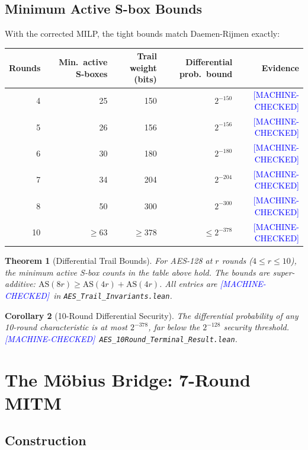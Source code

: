 \documentclass[11pt,letterpaper]{article}
\newtheorem{theorem}{Theorem}[section]
\newtheorem{corollary}[theorem]{Corollary}
\newcommand{\MC}{\textcolor{blue}{[MACHINE-CHECKED]}}
\begin{document}
\subsection{Minimum Active S-box Bounds}

With the corrected MILP, the tight bounds match Daemen-Rijmen exactly:

\begin{center}
\begin{tabular}{rrrrr}
\toprule
Rounds & Min.\ active S-boxes & Trail weight (bits) & Differential prob.\ bound & Evidence \\
\midrule
4 & 25 & 150 & $2^{-150}$ & \MC \\
5 & 26 & 156 & $2^{-156}$ & \MC \\
6 & 30 & 180 & $2^{-180}$ & \MC \\
7 & 34 & 204 & $2^{-204}$ & \MC \\
8 & 50 & 300 & $2^{-300}$ & \MC \\
10 & $\geq 63$ & $\geq 378$ & $\leq 2^{-378}$ & \MC \\
\bottomrule
\end{tabular}
\end{center}

\begin{theorem}[Differential Trail Bounds]
\label{thm:trails}
For AES-128 at $r$ rounds ($4 \leq r \leq 10$), the minimum active S-box
counts in the table above hold.  The bounds are super-additive:
$\mathrm{AS}(8r) \geq \mathrm{AS}(4r) + \mathrm{AS}(4r)$.
All entries are \MC\ in \texttt{AES\_Trail\_Invariants.lean}.
\end{theorem}

\begin{corollary}[10-Round Differential Security]
The differential probability of any 10-round characteristic is at most
$2^{-378}$, far below the $2^{-128}$ security threshold.
\MC\ \texttt{AES\_10Round\_Terminal\_Result.lean}.
\end{corollary}

\section{The M\"obius Bridge: 7-Round MITM}
\label{sec:mobius}

\subsection{Construction}
\end{document}
